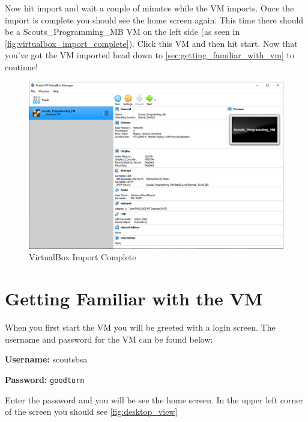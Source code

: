     Now hit import and wait a couple of minutes while the VM imports.
    Once the import is complete you should see the home screen again.
    This time there should be a Scouts_Programming_MB VM on the left side (as seen in \autoref{fig:virtualbox_import_complete}).
    Click this VM and then hit start.
    Now that you've got the VM imported head down to \autoref{sec:getting_familiar_with_vm} to continue!

    \begin{figure}[ht]
      \centering
      \includegraphics[width=0.8\linewidth]{virtualbox_import_complete.png}
      \caption{VirtualBox Import Complete}
      \label{fig:virtualbox_import_complete}
    \end{figure}
    \FloatBarrier

  \section{Getting Familiar with the VM}
  \label{sec:getting_familiar_with_vm}

    When you first start the VM you will be greeted with a login screen.
    The username and password for the VM can be found below:


    \vspace{5pt}
    \begin{mdframed}[]
      \textbf{Username:} scoutsbsa

      \textbf{Password:} \texttt{goodturn} 
    \end{mdframed}

    Enter the password and you will be see the home screen.
    In the upper left corner of the screen you should see \autoref{fig:desktop_view}

